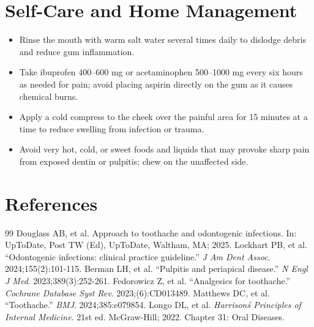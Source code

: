 \section*{Self-Care and Home Management}
\begin{itemize}
  \item Rinse the mouth with warm salt water several times daily to dislodge debris and reduce gum inflammation.
  \item Take ibuprofen 400--600 mg or acetaminophen 500--1000 mg every six hours as needed for pain; avoid placing aspirin directly on the gum as it causes chemical burns.
  \item Apply a cold compress to the cheek over the painful area for 15 minutes at a time to reduce swelling from infection or trauma.
  \item Avoid very hot, cold, or sweet foods and liquids that may provoke sharp pain from exposed dentin or pulpitis; chew on the unaffected side.
\end{itemize}

\section*{References}
\begin{thebibliography}{99}
 Douglass AB, et al. Approach to toothache and odontogenic infections. In: UpToDate, Post TW (Ed), UpToDate, Waltham, MA; 2025.
 Lockhart PB, et al. ``Odontogenic infections: clinical practice guideline.'' \emph{J Am Dent Assoc}. 2024;155(2):101-115.
 Berman LH, et al. ``Pulpitis and periapical disease.'' \emph{N Engl J Med}. 2023;389(3):252-261.
 Fedorowicz Z, et al. ``Analgesics for toothache.'' \emph{Cochrane Database Syst Rev}. 2023;(6):CD013489.
 Matthews DC, et al. ``Toothache.'' \emph{BMJ}. 2024;385:e079854.
 Longo DL, et al. \emph{Harrison\'s Principles of Internal Medicine}. 21st ed. McGraw-Hill; 2022. Chapter 31: Oral Diseases.
\end{thebibliography}
